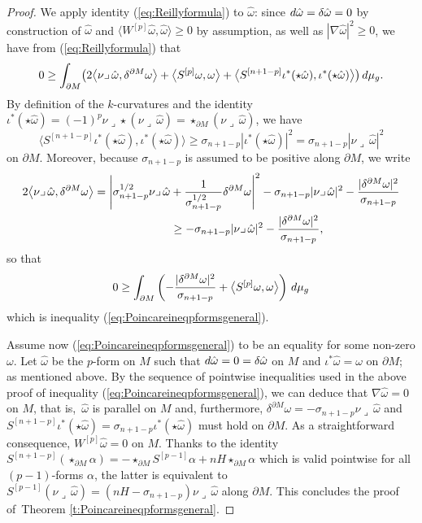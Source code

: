 \documentclass[11pt]{article}
\numberwithin{equation}{section}
\numberwithin{equation}{section}
\begin{document}
\begin{proof}
We apply identity (\ref{eq:Reillyformula}) to $\hat{\omega}$: since ${\rm d}\hat{\omega}=\delta\hat{\omega}=0$ by construction of $\hat{\omega}$ and $\bigl\langle W^{[p]}\hat{\omega},\hat{\omega}\bigr\rangle\geq0$ by assumption,  as well as $|\nabla\hat{\omega}|^2\geq 0$, we have from (\ref{eq:Reillyformula}) that
\[0\geq\int_{\partial M}\bigl(2\bigl\langle\nu\lrcorner\,\hat{\omega},\delta^{\partial M}\omega\bigr\rangle+\bigl\langle S^{[p]}\omega,\omega\bigr\rangle+\bigl\langle S^{[n+1-p]}\iota^*(\star\hat{\omega}),\iota^*(\star\hat{\omega})\bigr\rangle\bigr)\,{\rm d}\mu_g.\]
By definition of the $k$-curvatures and the identity $\iota^*(\star\hat{\omega})=(-1)^p\nu\lrcorner\star(\nu\lrcorner\,\hat{\omega})=\star_{\partial M}(\nu\lrcorner\,\hat{\omega})$, we have
\begin{equation}\label{eq:sn1p}
\bigl\langle S^{[n+1-p]}\iota^*(\star\hat{\omega}),\iota^*(\star\hat{\omega})\bigr\rangle\geq\sigma_{n+1-p}|\iota^*(\star\hat{\omega})|^2=\sigma_{n+1-p}|\nu\lrcorner\,\hat{\omega}|^2
\end{equation}
on $\partial M$. Moreover, because $\sigma_{n+1-p}$ is assumed to be positive along $\partial M$,  we write
\begin{gather*}
2\bigl\langle\nu\lrcorner\,\hat{\omega},\delta^{\partial M}\omega\bigr\rangle=\Biggl|\sigma_{n+1-p}^{1/2}\nu\lrcorner\,\hat{\omega}+\frac{1}{\sigma_{n+1-p}^{1/2}}\delta^{\partial M}\omega\Biggr|^2-\sigma_{n+1-p}|\nu\lrcorner\,\hat{\omega}|^2-\frac{|\delta^{\partial M}\omega|^2}{\sigma_{n+1-p}}\\
\hphantom{2\bigl\langle\nu\lrcorner\,\hat{\omega},\delta^{\partial M}\omega\bigr\rangle}
\geq-\sigma_{n+1-p}|\nu\lrcorner\,\hat{\omega}|^2-\frac{|\delta^{\partial M}\omega|^2}{\sigma_{n+1-p}},
\end{gather*}
so that
\[0\geq \int_{\partial M}\left(-\frac{|\delta^{\partial M}\omega|^2}{\sigma_{n+1-p}}+\bigl\langle S^{[p]}\omega,\omega\bigr\rangle\right)\,{\rm d}\mu_g\]
which is inequality   (\ref{eq:Poincareineqpformsgeneral}).

Assume now (\ref{eq:Poincareineqpformsgeneral}) to be an equality for some non-zero $\omega$. Let $\hat{\omega}$ be the $p$-form on $M$ such that ${\rm d}\hat{\omega}=0=\delta\hat{\omega}$ on $M$ and $\iota^*\hat{\omega}=\omega$ on $\partial M$; as mentioned above.
By the sequence of pointwise i\-ne\-qua\-li\-ties used in the above proof of i\-ne\-qua\-li\-ty (\ref{eq:Poincareineqpformsgeneral}), we can deduce that $\nabla\hat{\omega}=0$ on $M$, that is,~$\hat{\omega}$ is parallel on $M$  and, furthermore, $\delta^{\partial M}\omega=-\sigma_{n+1-p}\nu\lrcorner\,\hat{\omega}$ and $S^{[n+1-p]}\iota^*(\star\hat{\omega})=\sigma_{n+1-p}\iota^*(\star\hat{\omega})$ must hold on $\partial M$.  As a straightforward consequence, $W^{[p]}\hat{\omega}=0$ on $M$. Thanks to the identity $S^{[n+1-p]}(\star_{\partial M}\alpha)=-\star_{\partial M}S^{[p-1]}\alpha+nH\star_{\partial M}\alpha$ which is valid pointwise for all $(p-1)$-forms $\alpha$, the latter is equivalent to $S^{[p-1]}(\nu\lrcorner\,\hat{\omega})=(nH-\sigma_{n+1-p})\nu\lrcorner\,\hat{\omega}$ along $\partial M$. This concludes the proof of~Theorem \ref{t:Poincareineqpformsgeneral}.
\end{proof}
\end{document}
